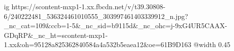  
 
 
 
 

\ifcmt
  ig https://scontent-mxp1-1.xx.fbcdn.net/v/t39.30808-6/240222481_536324461010555_303997461403339912_n.jpg?_nc_cat=109&ccb=1-5&_nc_sid=b9115d&_nc_ohc=j-9xG4UR5CAAX-GDqRP&_nc_ht=scontent-mxp1-1.xx&oh=95128a825362840584a4a532b5eaea12&oe=61B9D163
  @width 0.45
\fi
